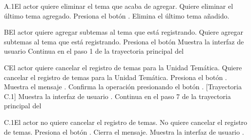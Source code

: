 \begin{UCtrayectoriaA}{A.1}{El actor quiere eliminar el tema que acaba de agregar.}
    \UCpaso[\UCactor] Quiere eliminar el último tema agregado.
    \UCpaso[\UCactor] Presiona el botón .
    \UCpaso Elimina el último tema añadido. 
\end{UCtrayectoriaA}


\begin{UCtrayectoriaA}{B}{El actor quiere agregar subtemas al tema que está registrando.}
    \UCpaso[\UCactor] Quiere agregar subtemas al tema que está registrando.
    \UCpaso[\UCactor] Presiona el botón 
    \UCpaso Muestra la interfaz de usuario 
    \UCpaso Continua en el paso 1 de la trayectoria principal del 
\end{UCtrayectoriaA}


\begin{UCtrayectoriaA}{C}{El actor quiere cancelar el registro de temas para la Unidad Temática.}
    \UCpaso[\UCactor] Quiere cancelar el registro de temas para la Unidad Temática.
    \UCpaso[\UCactor] Presiona el botón .
    \UCpaso Muestra el mensaje .
    \UCpaso[\UCactor] Confirma la operación presionando el botón . [Trayectoria C.1]
    \UCpaso Muestra la interfaz de usuario .
    \UCpaso Continua en el paso 7 de la trayectoria principal del 
\end{UCtrayectoriaA}


\begin{UCtrayectoriaA}{C.1}{El actor no quiere cancelar el registro de temas.}
    \UCpaso[\UCactor] No quiere cancelar el registro de temas.
    \UCpaso[\UCactor] Presiona el botón .
    \UCpaso Cierra el mensaje. 
    \UCpaso Muestra la interfaz de usuario .
\end{UCtrayectoriaA}


